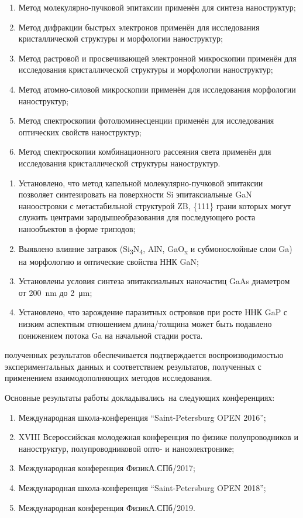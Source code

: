 {\methods}
\begin{enumerate}[beginpenalty=10000]
  \item Метод молекулярно-пучковой эпитаксии применён для синтеза наноструктур;
  \item Метод дифракции быстрых электронов применён для исследования кристаллической структуры и морфологии наноструктур;
  \item Метод растровой и просвечивающей электронной микроскопии применён для исследования кристаллической структуры и морфологии наноструктур;
  \item Метод атомно-силовой микроскопии применён для исследования морфологии наноструктур;
  \item Метод спектроскопии фотолюминесценции применён для исследования оптических свойств наноструктур;
  \item Метод спектроскопии комбинационного рассеяния света применён для исследования кристаллической структуры наноструктур.
\end{enumerate}

{}
\begin{enumerate}[beginpenalty=10000] %
  \item	Установлено, что метод капельной молекулярно-пучковой эпитаксии позволяет синтезировать на поверхности Si эпитаксиальные GaN наноостровки с метастабильной структурой ZB, \{111\} грани которых могут служить центрами зародышеобразования для последующего роста нанообъектов в форме триподов;
  \item Выявлено влияние затравок (Si\textsubscript{3}N\textsubscript{4}, AlN, GaO\textsubscript{x} и субмонослойные слои Ga) на морфологию и оптические свойства ННК GaN;
  \item Установлены условия синтеза эпитаксиальных наночастиц GaAs диаметром от 200~\si{\nano\metre} до 2~\si{\micro\metre};
  \item Установлено, что зарождение паразитных островков при росте ННК GaP с низким аспектным отношением длина/толщина может быть подавлено понижением потока Ga на начальной стадии роста.
\end{enumerate}

{\reliability} полученных результатов обеспечивается подтверждается воспроизводимостью экспериментальных данных и соответствием результатов, полученных с применением взаимодополняющих методов исследования.


{\probation}
Основные результаты работы докладывались~на следующих конференциях:
\begin{enumerate}[beginpenalty=10000]
  \item Международная школа-конференция “Saint-Petersburg OPEN 2016”;
  \item XVIII Всероссийская молодежная конференция по физике полупроводников и наноструктур, полупроводниковой опто- и наноэлектронике;
  \item Международная конференция ФизикА.СПб/2017;
  \item Международная школа-конференция “Saint-Petersburg OPEN 2018”;
  \item Международная конференция ФизикА.СПб/2019.
\end{enumerate}

